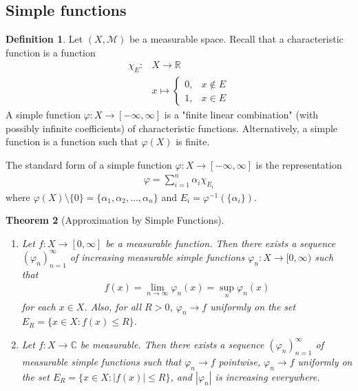 \documentclass[11pt]{amsart}
\newtheorem{theorem}{Theorem}[section]
\theoremstyle{definition}
\newtheorem{definition}[theorem]{Definition}
\numberwithin{equation}{section}
\begin{document}
\subsection{Simple functions}
\begin{definition}
    Let $(X,\mathcal M)$ be a measurable space. Recall that a characteristic function is a function
    \begin{align*}
        \chi_E:&X\to\mathbb R\\
        &x\mapsto\begin{cases}
            0, & x\not\in E\\
            1, & x\in E
        \end{cases}
    \end{align*}
    A simple function $\varphi:X\to[-\infty,\infty]$ is a "finite linear combination" (with possibly infinite coefficients) of characteristic functions. Alternatively, a simple function is a function such that $\varphi(X)$ is finite.

    The standard form of a simple function $\varphi:X\to[-\infty,\infty]$ is the representation
    \begin{align*}
        \varphi=\sum_{i=1}^n\alpha_i\chi_{E_i}
    \end{align*}
    where $\varphi(X)\setminus\{0\}=\{\alpha_1,\alpha_2,\ldots,\alpha_n\}$ and $E_i=\varphi^{-1}(\{\alpha_i\})$.
\end{definition}
\begin{theorem}[Approximation by Simple Functions]
    \begin{enumerate}
        \item [(a)] Let $f:X\to[0,\infty]$ be a measurable function. Then there exists a sequence $(\varphi_n)_{n=1}^\infty$ of increasing measurable simple functions $\varphi_n:X\to[0,\infty)$ such that
        \begin{align*}
            f(x)=\lim_{n\to\infty}\varphi_n(x)=\sup_{n}\varphi_n(x)
        \end{align*}
        for each $x\in X$. Also, for all $R>0$, $\varphi_n\to f$ uniformly on the set $E_R=\{x\in X:f(x)\le R\}$.
        \item [(b)] Let $f:X\to\mathbb C$ be measurable. Then there exists a sequence $(\varphi_n)_{n=1}^\infty$ of measurable simple functions such that $\varphi_n\to f$ pointwise, $\varphi_n\to f$ uniformly on the set $E_R=\{x\in X:|f(x)|\le R\}$, and $|\varphi_n|$ is increasing everywhere.
    \end{enumerate}
\end{theorem}
\end{document}
